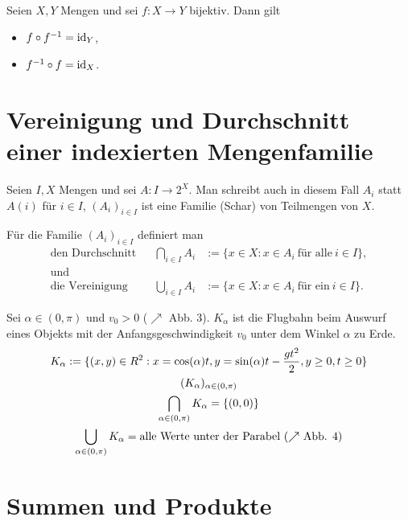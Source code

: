 \begin{bem}
	Seien $ X,Y $ Mengen und sei $ f : X \to Y $ bijektiv. Dann gilt
	\begin{itemize}
		\item $ f \circ f^{-1} = \operatorname{id}_Y $,
		\item $ f^{-1} \circ f = \operatorname{id}_X $.
	\end{itemize}
\end{bem} 

\section{Vereinigung und Durchschnitt einer indexierten Mengenfamilie}

\begin{defn}
Seien $ I,X $ Mengen und sei $ A : I \to 2^X $. Man schreibt auch in diesem Fall $ A_i $ statt $ A(i) $ für $ i \in I $, $ (A_i)_{i \in I} $ ist eine Familie (Schar) von Teilmengen von $ X $.

Für die Familie $ (A_i)_{i \in I} $ definiert man
\begin{align*}
	\text{den Durchschnitt} && \bigcap_{i \in I} A_i &:= \{ x \in X : x \in A_i \:\text{für alle}\: i \in I \},\\
	\text{und} \\ 
	\text{die Vereinigung} && \bigcup_{i \in I} A_i &:= \{ x \in X : x \in A_i \:\text{für ein}\: i \in I \}.
\end{align*}
\end{defn} 

\begin{bsp}
	Sei $ \alpha \in (0,\pi) $ und $ v_0 > 0 $ ($ \nearrow $ Abb. 3). $ K_\alpha $ ist die Flugbahn beim Auswurf eines Objekts mit der Anfangsgeschwindigkeit $ v_0 $ unter dem Winkel $ \alpha $ zu Erde.
	\begin{gather*}
		K_\alpha := \{ (x,y) \in R^2 : x = \cos(\alpha)t, y = \sin(\alpha)t - \frac{gt^2}{2}, y \geq 0, t \geq 0 \}\\
		( K_\alpha )_{\alpha \in (0,\pi)}\\
		\bigcap_{\alpha \in (0,\pi)} K_\alpha = \{ (0,0) \}\\
		\bigcup_{\alpha \in (0,\pi)} K_\alpha = \text{alle Werte unter der Parabel ($ \nearrow $ Abb. 4)}
	\end{gather*}
\end{bsp}

\section{Summen und Produkte}


